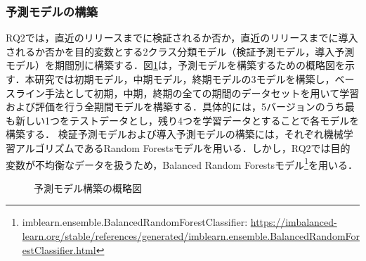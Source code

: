 \documentclass[T,J]{fose} %
\newcommand{\change}[1]{\colorbox{green}{{\bf CHANGE}:}{\color{black} {\textbf{[#1]}}}}
\begin{document}
\subsubsection{予測モデルの構築}
RQ2では，直近のリリースまでに検証されるか否か，直近のリリースまでに導入されるか否かを目的変数とする2クラス分類モデル（検証予測モデル，導入予測モデル）を期間別に構築する．図\ref{fig:predict_schematic}は，予測モデルを構築するための概略図を示す．本研究では初期モデル，中期モデル，終期モデルの3モデルを構築し，ベースライン手法として初期，中期，終期の全ての期間のデータセットを用いて学習および評価を行う全期間モデルを構築する．具体的には，5バージョンのうち最も新しい1つをテストデータとし，残り4つを学習データとすることで各モデルを構築する．
検証予測モデルおよび導入予測モデルの構築には，それぞれ機械学習アルゴリズムであるRandom Forestsモデル\cite{randomforest}を用いる．しかし，RQ2では目的変数が不均衡なデータを扱うため，Balanced Random Forestsモデル\footnote{imblearn.ensemble.BalancedRandomForestClassifier: \url{https://imbalanced-learn.org/stable/references/generated/imblearn.ensemble.BalancedRandomForestClassifier.html}}を用いる．

\begin{figure}[t]
\begin{center}
\caption{予測モデル構築の概略図}
\label{fig:predict_schematic}
\end{center}
\end{figure}
\end{document}
